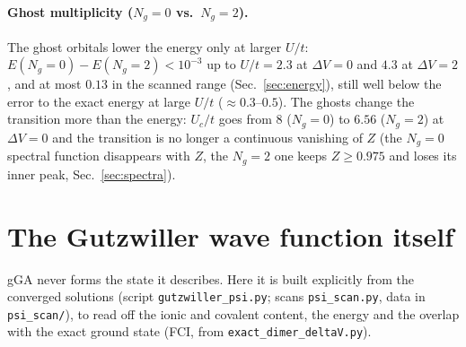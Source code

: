 \documentclass[11pt]{article}
\newcommand{\Ng}{N_{g}}
\newcommand{\dV}{\Delta V}
\begin{document}
\paragraph{Ghost multiplicity ($\Ng=0$ vs.\ $\Ng=2$).}
The ghost orbitals lower the energy only at larger $U/t$: $E(\Ng{=}0)-E(\Ng{=}2)<10^{-3}$ up to $U/t=2.3$ at $\dV=0$ and $4.3$ at $\dV=2$, and at most $0.13$ in the scanned range (Sec.~\ref{sec:energy}), still well below the error to the exact energy at large $U/t$ ($\approx0.3$--$0.5$).
The ghosts change the transition more than the energy: $U_c/t$ goes from $8$ ($\Ng=0$) to $6.56$ ($\Ng=2$) at $\dV=0$ and the transition is no longer a continuous vanishing of $Z$ (the $\Ng=0$ spectral function disappears with $Z$, the $\Ng=2$ one keeps $Z\ge0.975$ and loses its inner peak, Sec.~\ref{sec:spectra}).

\section{The Gutzwiller wave function itself}
\label{sec:psi}

gGA never forms the state it describes. Here it is built explicitly from the converged solutions (script \texttt{gutzwiller\_psi.py}; scans \texttt{psi\_scan.py}, data in \texttt{psi\_scan/}), to read off the ionic and covalent content, the energy and the overlap with the exact ground state (FCI, from \texttt{exact\_dimer\_deltaV.py}).
\end{document}
